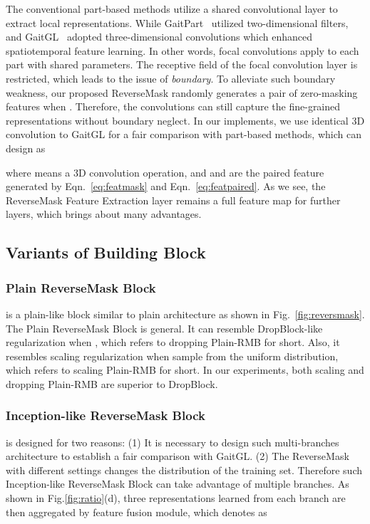 \documentclass[runningheads]{llncs}
\begin{document}
The conventional part-based methods utilize a shared convolutional layer to extract local representations. While GaitPart~\cite{gaitpart} utilized two-dimensional filters, and GaitGL~\cite{gaitgl} adopted three-dimensional convolutions which enhanced spatiotemporal feature learning. In other words, focal convolutions apply to each part with shared parameters. The receptive field of the focal convolution layer is restricted, which leads to the issue of \textit{boundary}. To alleviate such boundary weakness, our proposed ReverseMask randomly generates a pair of zero-masking features when . Therefore, the convolutions can still capture the fine-grained representations without boundary neglect. In our implements, we use identical 3D convolution to GaitGL\cite{gaitgl} for a fair comparison with part-based methods, which can design as
    
    where  means a 3D convolution operation, and  and  are the paired feature generated by Eqn.~\ref{eq:featmask} and Eqn.~\ref{eq:featpaired}. As we see, the ReverseMask Feature Extraction layer remains a full feature map for further layers, which brings about many advantages. 




\subsection{Variants of Building Block}
\label{subsection:block}

\subsubsection{Plain ReverseMask Block} is a plain-like block similar to plain architecture as shown in Fig.~\ref{fig:reversmask}. The Plain ReverseMask Block is general. It can resemble DropBlock-like regularization when , which refers to dropping Plain-RMB for short. Also, it resembles scaling regularization when  sample from the uniform distribution,  which refers to scaling Plain-RMB for short. In our experiments, both scaling and dropping Plain-RMB are superior to DropBlock.   

\subsubsection{Inception-like ReverseMask Block} is designed for two reasons: (1) It is necessary to design such multi-branches architecture to establish a fair comparison with GaitGL. (2) The ReverseMask with different settings changes the distribution of the training set. Therefore such Inception-like ReverseMask Block can take advantage of multiple branches.  As shown in Fig.\ref{fig:ratio}(d), three representations learned from each branch are then aggregated by feature fusion module, which denotes as
    
\end{document}
